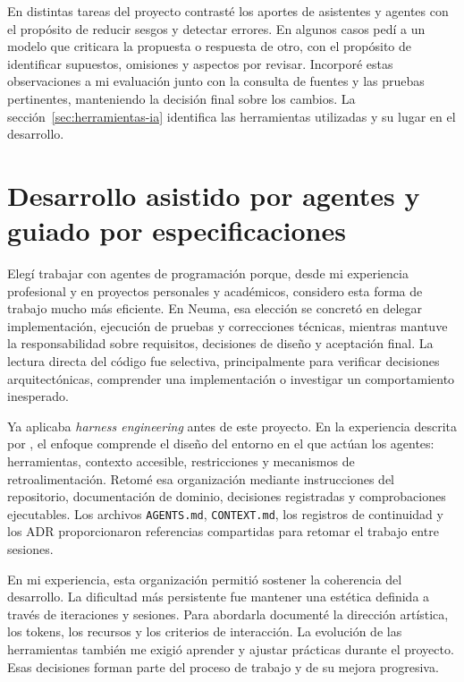 En distintas tareas del proyecto contrasté los aportes de asistentes y agentes
con el propósito de reducir sesgos y
detectar errores. En algunos casos pedí a un modelo que
criticara la propuesta o respuesta de otro, con el propósito de identificar
supuestos, omisiones y aspectos por revisar. Incorporé estas observaciones a mi
evaluación junto con la consulta de fuentes y las pruebas pertinentes, manteniendo
la decisión final sobre los cambios. La sección~\ref{sec:herramientas-ia}
identifica las herramientas utilizadas y su lugar en el desarrollo.

\section{Desarrollo asistido por agentes y guiado por especificaciones}
\label{sec:metodo-desarrollo}
Elegí trabajar con agentes de programación porque, desde mi experiencia profesional
y en proyectos personales y académicos, considero esta forma de trabajo mucho más
eficiente. En Neuma, esa elección se concretó en delegar implementación, ejecución
de pruebas y correcciones técnicas, mientras mantuve la responsabilidad sobre
requisitos, decisiones de diseño y aceptación final. La lectura directa del código
fue selectiva, principalmente para verificar decisiones arquitectónicas, comprender
una implementación o investigar un comportamiento inesperado.

Ya aplicaba \textit{harness engineering} antes de este proyecto. En la experiencia
descrita por \textcite{lopopolo2026harness}, el enfoque comprende el diseño del entorno
en el que actúan los agentes: herramientas, contexto accesible, restricciones y
mecanismos de retroalimentación. Retomé esa organización mediante instrucciones
del repositorio, documentación de dominio, decisiones registradas y comprobaciones
ejecutables. Los archivos \texttt{AGENTS.md}, \texttt{CONTEXT.md}, los registros
de continuidad y los ADR proporcionaron referencias compartidas para retomar
el trabajo entre sesiones.

En mi experiencia, esta organización permitió sostener la coherencia del desarrollo.
La dificultad más persistente fue mantener una estética definida a través de
iteraciones y sesiones. Para abordarla documenté la dirección artística, los tokens,
los recursos y los criterios de interacción. La evolución de las herramientas
también me exigió aprender y ajustar prácticas durante el proyecto. Esas decisiones
forman parte del proceso de trabajo y de su mejora progresiva.

